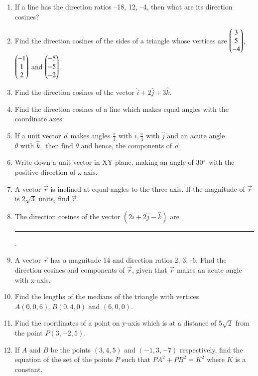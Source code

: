 \begin{enumerate}[label=\thesubsection.\arabic*,ref=\thesubsection.\theenumi]
	\\
\solution
		
\item If a line has the direction ratios –18, 12, –4, then what are its direction cosines?
		\\
		\solution
		
	\item Find the direction cosines of the sides of a triangle whose vertices are $\begin{pmatrix}3\\ 5\\-4 \end{pmatrix}$, $\begin{pmatrix} -1\\1 \\2 \end{pmatrix}$ and $\begin{pmatrix}-5 \\-5 \\-2 \end{pmatrix}$.
		\\
		\solution
		
\item Find the direction cosines of the vector $\hat{i}+2\hat{j}+3\hat{k}$.
	\\
    \solution 
		
    \item Find the direction cosines of a line which makes equal angles with the coordinate
    axes.
		\\
		\solution
		
\item If a unit vector $\overrightarrow{a}$ makes angles $\frac{\pi}{3}\text{ with }\hat{i}, \frac{\pi}{4}\text{ with }\hat{j}$ and an acute angle $\theta \text{ with }\hat{k},\text{ then find } \theta$ and hence, the components of $\overrightarrow{a}$.
	\\
		\solution
		
\item Write down a unit vector in XY-plane, making an angle of 30$\degree$ with the positive direction of x-axis.\\
\item A vector $\vec{r}$ is inclined at equal angles to the three axis. If the magnitude of $\vec{r}$ is $2\sqrt{3}$ units, find $\vec{r}$.
\item The direction cosines of the vector $(2\hat{i}+2\hat{j}-\hat{k})$ are \noindent\rule{2cm}{0.4pt}.
\item A vector $\vec{r}$ has a magnitude 14 and direction ratios 2, 3, -6. Find the direction cosines and components of $\vec{r}$, given that $\vec{r}$ makes an acute angle with x-axis.
\item Find the lengths of the medians of the triangle with vertices $A(0,0,6), B(0,4,0)$ and $(6,0,0)$.
\item Find the coordinates of a point on y-axis which is at a distance of $5\sqrt2$ from the point $P(3,-2,5)$.
\item If $A$ and $B$ be the points $(3,4,5)$ and $(-1,3,-7)$ respectively, find the equation of the set of the points $P$ such that $PA^2+PB^2=K^2$ where $K$ is a constant.
\end{enumerate}
